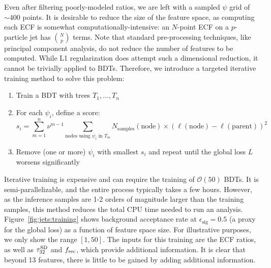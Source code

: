 Even after filtering poorly-modeled ratios, we are left with a sampled $\psi$ grid of ${\sim400}$ points.
It is desirable to reduce the size of the feature space, as computing each ECF is somewhat computationally-intensive: an $N$-point ECF on a $p$-particle jet has $\binom{N}{p}$ terms. 
Note that standard pre-processing techniques, like principal component analysis, do not reduce the number of features to be computed. 
While L1 regularization does attempt such a dimensional reduction, it cannot be trivially applied to BDTs. 
Therefore, we introduce a targeted iterative training method to solve this problem:
\begin{enumerate}
    \item Train a BDT with trees $T_1,\dots,T_n$
    \item For each $\psi_i$, define a score:
        \begin{equation}
             s_i = \sum_{m=1}^n \nu^{m-1} \sum_{\text{nodes using $\psi_i$ in $T_m$}} N_\text{samples}(\mathrm{node}) \times \left(\ell(\mathrm{node}) - \ell(\mathrm{parent})\right)^2  
        \end{equation}
    \item Remove (one or more) $\psi_i$ with smallest $s_i$ and repeat until the global loss $L$ worsens significantly
\end{enumerate}
Iterative training is expensive and can require the training of $\mathcal{O}(50)$ BDTs.
It is semi-parallelizable, and the entire process typically takes a few hours.
However, as the inference samples are 1-2 orders of magnitude larger than the training samples, this method reduces the total CPU time needed to run an analysis. 
Figure~\ref{fig:jets:training} shows background acceptance rate at $\epsilon_\mathrm{sig}=0.5$ (a proxy for the global loss) as a function of feature space size. 
For illustrative purposes, we only show the range $[1,50]$.
The inputs for this training are the ECF ratios, as well as $\tau_{32}^{\mathrm{SD}}$ and $f_\mathrm{rec}$, which provide additional information.
It is clear that beyond 13 features, there is little to be gained by adding additional information.

